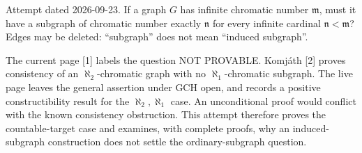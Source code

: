 Attempt dated 2026-09-23. If a graph $G$ has infinite chromatic number $\mathfrak m$, must it have a subgraph of chromatic number exactly $\mathfrak n$ for every infinite cardinal $\mathfrak n<\mathfrak m$? Edges may be deleted: ``subgraph'' does not mean ``induced subgraph''.

The current page [1] labels the question NOT PROVABLE. Komj\'ath [2] proves consistency of an $\aleph_2$-chromatic graph with no $\aleph_1$-chromatic subgraph. The live page leaves the general assertion under GCH open, and records a positive constructibility result for the $\aleph_2,\aleph_1$ case. An unconditional proof would conflict with the known consistency obstruction. This attempt therefore proves the countable-target case and examines, with complete proofs, why an induced-subgraph construction does not settle the ordinary-subgraph question.
